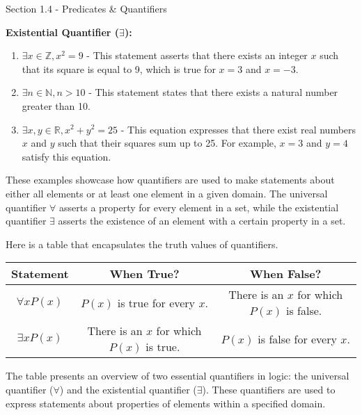 \begin{notes}{Section 1.4 - Predicates \& Quantifiers}
\begin{highlight}
        \textbf{Existential Quantifier (\(\exists\)):}
        \begin{enumerate}
            \item \(\exists x \in \mathbb{Z}, x^2 = 9\) - This statement asserts that there exists an integer \(x\) such that its square is equal to 9, which is true for \(x = 3\) and \(x = -3\).
            \item \(\exists n \in \mathbb{N}, n > 10\) - This statement states that there exists a natural number greater than 10.
            \item \(\exists x, y \in \mathbb{R}, x^2 + y^2 = 25\) - This equation expresses that there exist real numbers \(x\) and \(y\) such that their squares sum up to 25. For example, \(x = 3\) and \(y = 4\) satisfy this equation.
        \end{enumerate}
        These examples showcase how quantifiers are used to make statements about either all elements or at least one element in a given domain. The universal quantifier \(\forall\) asserts a property for every element in a set, while the existential 
        quantifier \(\exists\) asserts the existence of an element with a certain property in a set.
    \end{highlight}

    Here is a table that encapsulates the truth values of quantifiers.

    \begin{center}
        \begin{tabular}{|c|c|c|}
            \hline \textbf{Statement} & \textbf{When True?} & \textbf{When False?} \\ \hline
            \(\forall x P(x)\) & \(P(x)\) is true for every \(x\). & There is an \(x\) for which \(P(x)\) is false. \\ \hline
            \(\exists x P(x)\) & There is an \(x\) for which \(P(x)\) is true. & \(P(x)\) is false for every \(x\). \\ \hline
        \end{tabular}
    \end{center}

    The table presents an overview of two essential quantifiers in logic: the universal quantifier (\(\forall\)) and the existential quantifier (\(\exists\)). These quantifiers are used to express statements about properties of elements within a 
    specified domain. 
    

\end{notes}
